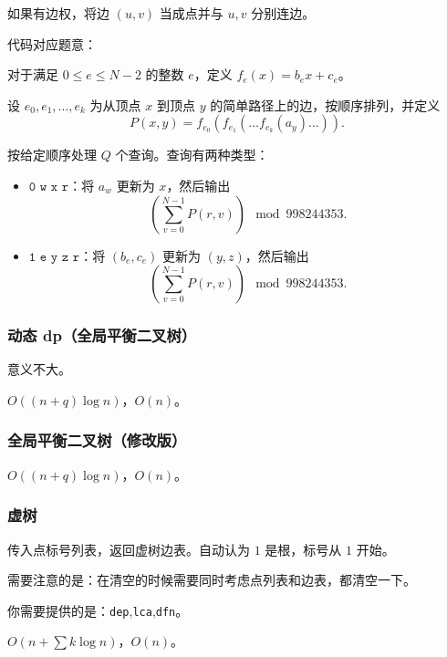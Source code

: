 \documentclass[12pt]{ctexart}
\begin{document}
如果有边权，将边 $(u,v)$ 当成点并与 $u,v$ 分别连边。

代码对应题意：

对于满足 $0 \leq e \leq N - 2$ 的整数 $e$，定义 $f_e(x) = b_e x + c_e$。

设 $e_0, e_1, \ldots, e_k$ 为从顶点 $x$ 到顶点 $y$ 的简单路径上的边，按顺序排列，并定义
\[
	P(x, y) = f_{e_0}(f_{e_1}(\ldots f_{e_k}(a_y) \ldots)).
\]

按给定顺序处理 $Q$ 个查询。查询有两种类型：

\begin{itemize}
	\item $\texttt{0 w x r}$：将 $a_w$ 更新为 $x$，然后输出
	      \[
		      \left( \sum_{v=0}^{N-1} P(r, v) \right) \mod 998244353.
	      \]
	\item $\texttt{1 e y z r}$：将 $(b_e, c_e)$ 更新为 $(y, z)$，然后输出
	      \[
		      \left( \sum_{v=0}^{N-1} P(r, v) \right) \mod 998244353.
	      \]
\end{itemize}



\subsubsection{动态 dp（全局平衡二叉树）}

意义不大。

$O((n+q)\log n)$，$O(n)$。



\subsubsection{全局平衡二叉树（修改版）}

$O((n+q)\log n)$，$O(n)$。



\subsubsection{虚树}

传入点标号列表，返回虚树边表。自动认为 $1$ 是根，标号从 $1$ 开始。

需要注意的是：在清空的时候需要同时考虑点列表和边表，都清空一下。

你需要提供的是：\verb|dep|,\verb|lca|,\verb|dfn|。

$O(n+\sum k\log n)$，$O(n)$。
\end{document}
